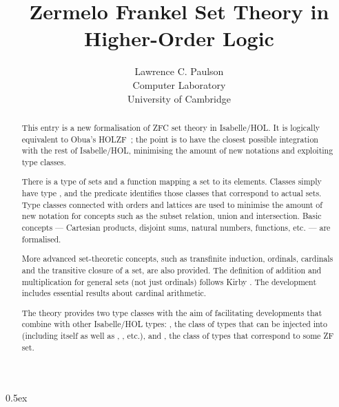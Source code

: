 \documentclass[11pt,a4paper]{article}
\begin{document}
\title{Zermelo Frankel Set Theory in Higher-Order Logic}
\author{Lawrence C. Paulson\\ Computer Laboratory\\ University of Cambridge}

\maketitle

\begin{abstract}
This entry is a new formalisation of ZFC set theory in Isabelle/HOL\@.
It is logically equivalent to Obua's HOLZF~\cite{obua-partizan-games}; the point is to have the closest possible integration
with the rest of Isabelle/HOL, minimising the amount of new notations and exploiting type classes.

There is a type  of sets and a function 
 mapping a set to its elements.
Classes simply have type , and the predicate  identifies those classes that correspond to actual sets.
Type classes connected with orders and lattices are used to minimise the amount of new notation
for concepts such as the subset relation, union and intersection.
Basic concepts --- Cartesian products, disjoint sums, natural numbers, functions, etc. --- are formalised.

More advanced set-theoretic concepts, such as transfinite induction, ordinals, cardinals
and the transitive closure of a set, are also provided.
The definition of addition and multiplication for general sets (not just ordinals) follows Kirby \cite{kirby-addition}.
The development includes essential results about cardinal arithmetic.

The theory provides two type classes with the aim of
facilitating developments that combine  with other Isabelle/HOL types:
, the class of types that can be injected into~ (including  itself as well as , , etc.), and
, the class of types that correspond to some ZF set.
\end{abstract}

\newpage
\tableofcontents

\parindent 0pt\parskip 0.5ex

\newpage




\end{document}
